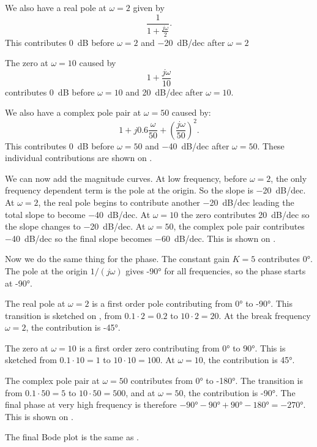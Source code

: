 \begin{exa}
  We also have a real pole at $\omega = 2$ given by
  \begin{equation*}
    \frac{1}{1 + \frac{j\omega}{2}}
  .\end{equation*}
  This contributes \qty{0}{\dB} before $\omega = 2$ and \qty{-20}{\dB/dec} after $\omega = 2$

  The zero at $\omega = 10$ caused by
  \begin{equation*}
    1 + \frac{j\omega}{10}
  \end{equation*}
  contributes \qty{0}{\dB} before $\omega = 10$ and \qty{20}{\dB/dec} after $\omega = 10$.

  We also have a complex pole pair at $\omega = 50$ caused by:
  \begin{equation*}
    1 + j \num{0,6} \frac{\omega}{50} + \left( \frac{j\omega}{50} \right)^2
  .\end{equation*}
  This contributes \qty{0}{\dB} before $\omega = 50$ and \qty{-40}{\dB/dec} after $\omega = 50$.
  These individual contributions are shown on .

  We can now add  the magnitude curves.
  At low frequency, before $\omega = 2$, the only frequency dependent term is the pole at the origin.
  So the slope is \qty{-20}{\dB/dec}.
  At $\omega = 2$, the real pole begins to contribute another \qty{-20}{\dB/dec} leading the total slope to become \qty{-40}{\dB/dec}.
  At $\omega = 10$ the zero contributes \qty{20}{\dB/dec} so the slope changes to \qty{-20}{\dB/dec}.
  At $\omega = 50$, the complex pole pair contributes \qty{-40}{\dB/dec} so the final slope becomes \qty{-60}{\dB/dec}.
  This is shown on .

  Now we do the same thing for the phase.
  The constant gain $K = 5$ contributes \ang{0}.
  The pole at the origin $1 / (j\omega)$ gives \ang{-90} for all frequencies, so the phase starts at \ang{-90}.

  The real pole at $\omega = 2$ is a first order pole contributing from \ang{0} to \ang{-90}.
  This transition is sketched on , from $\num{0,1} \cdot 2 = \num{0,2} $ to $10 \cdot 2 = 20$.
  At the break frequency $\omega = 2$, the contribution is \ang{-45}.
  
  The zero at $\omega = 10$ is a first order zero contributing from \ang{0}  to \ang{90}.
  This is sketched from $\num{0,1} \cdot 10 = 1$ to $10 \cdot 10 = 100$.
  At $\omega = 10$, the contribution is \ang{45}. 

  The complex pole pair at $\omega = 50$ contributes from \ang{0} to \ang{-180}.
  The transition is from $\num{0,1} \cdot 50 = 5$ to $10 \cdot 50 = 500$, and at $\omega = 50$, the contribution is \ang{-90}.
  The final phase at very high frequency is therefore $\ang{-90} -\ang{90} +\ang{90} -\ang{180} =\ang{-270}$.
  This is shown on .

  The final Bode plot is the same as .
\end{exa}

